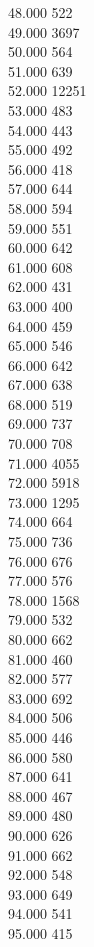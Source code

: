 { 48.000	522 \\
 49.000	3697 \\
 50.000	564 \\
 51.000	639 \\
 52.000	12251 \\
 53.000	483 \\
 54.000	443 \\
 55.000	492 \\
 56.000	418 \\
 57.000	644 \\
 58.000	594 \\
 59.000	551 \\
 60.000	642 \\
 61.000	608 \\
 62.000	431 \\
 63.000	400 \\
 64.000	459 \\
 65.000	546 \\
 66.000	642 \\
 67.000	638 \\
 68.000	519 \\
 69.000	737 \\
 70.000	708 \\
 71.000	4055 \\
 72.000	5918 \\
 73.000	1295 \\
 74.000	664 \\
 75.000	736 \\
 76.000	676 \\
 77.000	576 \\
 78.000	1568 \\
 79.000	532 \\
 80.000	662 \\
 81.000	460 \\
 82.000	577 \\
 83.000	692 \\
 84.000	506 \\
 85.000	446 \\
 86.000	580 \\
 87.000	641 \\
 88.000	467 \\
 89.000	480 \\
 90.000	626 \\
 91.000	662 \\
 92.000	548 \\
 93.000	649 \\
 94.000	541 \\
 95.000	415 \\
}
